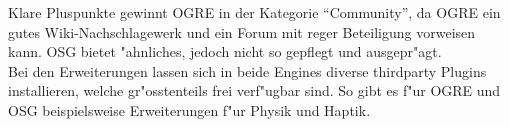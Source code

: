 Klare Pluspunkte gewinnt OGRE in der Kategorie "`Community"', da OGRE ein gutes Wiki-Nachschlagewerk und ein Forum mit reger Beteiligung vorweisen kann. OSG bietet "ahnliches, jedoch nicht so gepflegt und ausgepr"agt. \\
Bei den Erweiterungen lassen sich in beide Engines diverse thirdparty Plugins installieren, welche gr"osstenteils frei verf"ugbar sind. So gibt es f"ur OGRE und OSG beispielsweise Erweiterungen f"ur Physik und Haptik. 
